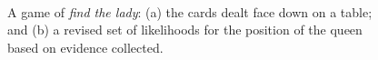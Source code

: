 \documentclass[xcolor={table}]{beamer}
\begin{document}
 \begin{frame} [plain]
\begin{figure}
\centering
{} \\
\caption{A game of \textit{find the lady}: (a) the cards dealt face down on a table; and (b) a revised set of likelihoods for the position of the queen based on evidence collected.}
\label{fig:3cardTrick3}
\end{figure}
\end{frame} 
\end{document}
